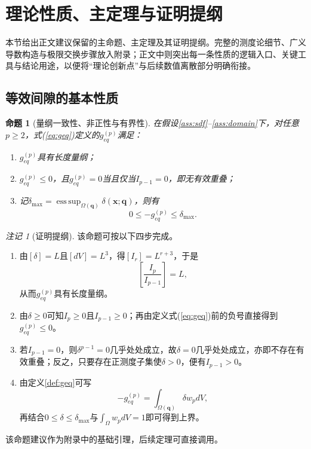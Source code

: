 ﻿\documentclass[12pt, a4paper]{ctexart}
\theoremstyle{plain}
\newtheorem{proposition}{命题}
\theoremstyle{remark}
\newtheorem{remark}{注记}
\begin{document}
\section{理论性质、主定理与证明提纲}
本节给出正文建议保留的主命题、主定理及其证明提纲。完整的测度论细节、广义导数构造与极限交换步骤放入附录；正文中则突出每一条性质的逻辑入口、关键工具与结论用途，以便将“理论创新点”与后续数值离散部分明确衔接。

\subsection{等效间隙的基本性质}
\begin{proposition}[量纲一致性、非正性与有界性]\label{prop:basic}
在假设\ref{ass:sdf}--\ref{ass:domain}下，对任意$p \ge 2$，式(\ref{eq:geq})定义的$g_{eq}^{(p)}$满足：
\begin{enumerate}
    \item $g_{eq}^{(p)}$具有长度量纲；
    \item $g_{eq}^{(p)} \le 0$，且$g_{eq}^{(p)} = 0$当且仅当$I_{p-1} = 0$，即无有效重叠；
    \item 记$\delta_{\max} = \operatorname*{ess\,sup}_{\Omega(\bm{q})} \delta(\bm{x};\bm{q})$，则有
    \begin{equation}
        0 \le -g_{eq}^{(p)} \le \delta_{\max}.
    \end{equation}
\end{enumerate}
\end{proposition}

\begin{remark}[证明提纲]
该命题可按以下四步完成。
\begin{enumerate}
    \item 由$[\delta] = L$且$[dV] = L^3$，得$[I_r] = L^{r+3}$，于是
    \begin{equation}
        \left[\frac{I_p}{I_{p-1}}\right] = L,
    \end{equation}
    从而$g_{eq}^{(p)}$具有长度量纲。
    \item 由$\delta \ge 0$可知$I_p \ge 0$且$I_{p-1} \ge 0$；再由定义式(\ref{eq:geq})前的负号直接得到$g_{eq}^{(p)} \le 0$。
    \item 若$I_{p-1} = 0$，则$\delta^{p-1} = 0$几乎处处成立，故$\delta = 0$几乎处处成立，亦即不存在有效重叠；反之，只要存在正测度子集使$\delta > 0$，便有$I_{p-1} > 0$。
    \item 由定义\ref{def:geq}可写
    \begin{equation}
        -g_{eq}^{(p)} = \int_{\Omega(\bm{q})} \delta w_p dV,
    \end{equation}
    再结合$0 \le \delta \le \delta_{\max}$与$\int_\Omega w_p dV = 1$即可得到上界。
\end{enumerate}
该命题建议作为附录中的基础引理，后续定理可直接调用。
\end{remark}
\end{document}
